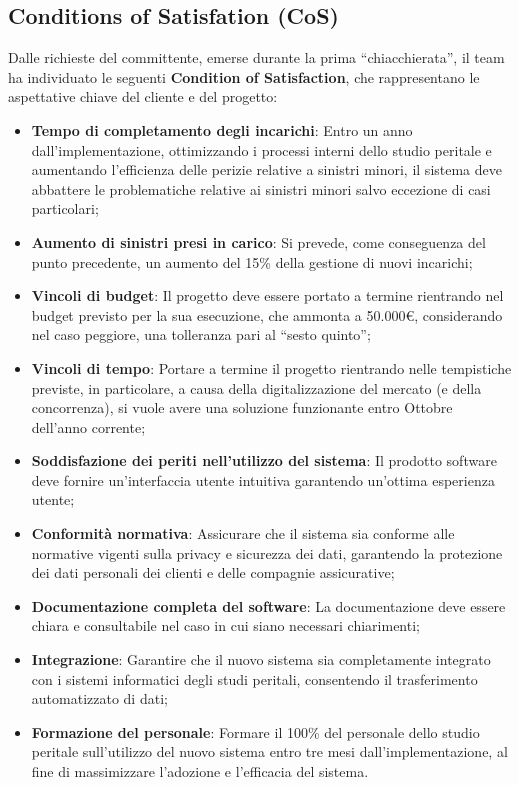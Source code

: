 \documentclass[a4paper,12pt, openright]{report}
\begin{document}
\subsection{Conditions of Satisfation (CoS)}
Dalle richieste del committente, emerse durante la prima ``chiacchierata'', il team ha individuato le seguenti \textbf{Condition of Satisfaction}, che rappresentano le aspettative chiave del cliente e del progetto:
\begin{itemize}
    \item \textbf{Tempo di completamento degli incarichi}: Entro un anno dall'implementazione, ottimizzando i processi interni dello studio peritale e aumentando l’efficienza delle perizie relative a sinistri minori, il sistema deve abbattere le problematiche relative ai sinistri minori salvo eccezione di casi particolari;
    \item \textbf{Aumento di sinistri presi in carico}: Si prevede, come conseguenza del punto precedente, un aumento del 15\% della gestione di nuovi incarichi;
    \item \textbf{Vincoli di budget}: Il progetto deve essere portato a termine rientrando nel budget previsto per la sua esecuzione, che ammonta a 50.000€, considerando nel caso peggiore, una tolleranza pari al ``sesto quinto'';
    \item \textbf{Vincoli di tempo}: Portare a termine il progetto rientrando nelle tempistiche previste, in particolare, a causa della digitalizzazione del mercato (e della concorrenza), si vuole avere una soluzione funzionante entro Ottobre dell'anno corrente;
    \item \textbf{Soddisfazione dei periti nell'utilizzo del sistema}: Il prodotto software deve fornire un'interfaccia utente intuitiva garantendo un'ottima esperienza utente;
    \item \textbf{Conformità normativa}: Assicurare che il sistema sia conforme alle normative vigenti sulla privacy e sicurezza dei dati, garantendo la protezione dei dati personali dei clienti e delle compagnie assicurative;
    \item \textbf{Documentazione completa del software}: La documentazione deve essere chiara e consultabile nel caso in cui siano necessari chiarimenti;
    \item \textbf{Integrazione}: Garantire che il nuovo sistema sia completamente integrato con i sistemi informatici degli studi peritali, consentendo il trasferimento automatizzato di dati;
    \item \textbf{Formazione del personale}: Formare il 100\% del personale dello studio peritale sull'utilizzo del nuovo sistema entro tre mesi dall'implementazione, al fine di massimizzare l'adozione e l'efficacia del sistema.
\end{itemize}
\end{document}
